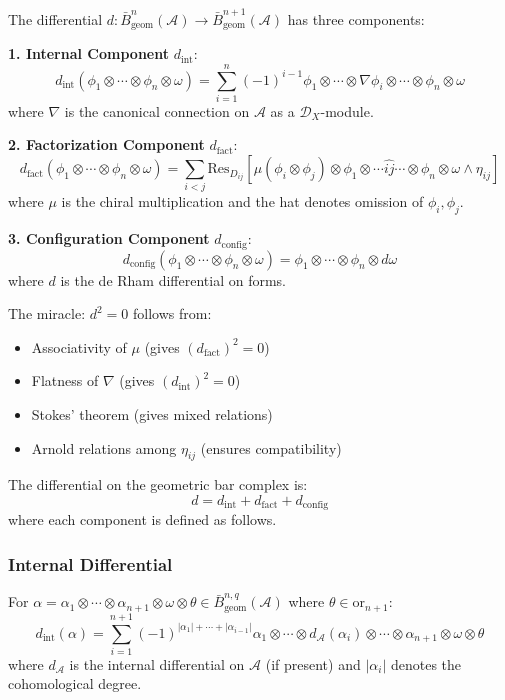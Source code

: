 \begin{definition}\label{def:bar-diff-detailed}
The differential $d: \bar{B}_{\text{geom}}^n(\mathcal{A}) \to \bar{B}_{\text{geom}}^{n+1}(\mathcal{A})$ has three components:

\textbf{1. Internal Component} $d_{\text{int}}$:
$$d_{\text{int}}(\phi_1 \otimes \cdots \otimes \phi_n \otimes \omega) = 
\sum_{i=1}^n (-1)^{i-1} \phi_1 \otimes \cdots \otimes \nabla\phi_i \otimes \cdots \otimes \phi_n \otimes \omega$$
where $\nabla$ is the canonical connection on $\mathcal{A}$ as a $\mathcal{D}_X$-module.

\textbf{2. Factorization Component} $d_{\text{fact}}$:
$$d_{\text{fact}}(\phi_1 \otimes \cdots \otimes \phi_n \otimes \omega) = 
\sum_{i<j} \text{Res}_{D_{ij}}[\mu(\phi_i \otimes \phi_j) \otimes \phi_1 \otimes \cdots \widehat{ij} \cdots \otimes \phi_n \otimes \omega \wedge \eta_{ij}]$$
where $\mu$ is the chiral multiplication and the hat denotes omission of $\phi_i, \phi_j$.

\textbf{3. Configuration Component} $d_{\text{config}}$:
$$d_{\text{config}}(\phi_1 \otimes \cdots \otimes \phi_n \otimes \omega) = 
\phi_1 \otimes \cdots \otimes \phi_n \otimes d\omega$$
where $d$ is the de Rham differential on forms.

The miracle: $d^2 = 0$ follows from:
\begin{itemize}
\item Associativity of $\mu$ (gives $(d_{\text{fact}})^2 = 0$)
\item Flatness of $\nabla$ (gives $(d_{\text{int}})^2 = 0$)  
\item Stokes' theorem (gives mixed relations)
\item Arnold relations among $\eta_{ij}$ (ensures compatibility)
\end{itemize}
\end{definition}

\begin{definition}\label{def:diff-total}
The differential on the geometric bar complex is:
\[
d = d_{\text{int}} + d_{\text{fact}} + d_{\text{config}}
\]
where each component is defined as follows.
\end{definition}
 
\subsubsection{Internal Differential}
 
\begin{definition}
For $\alpha = \alpha_1 \otimes \cdots \otimes \alpha_{n+1} \otimes \omega \otimes \theta \in 
\bar{B}^{n,q}_{\text{geom}}(\mathcal{A})$ where $\theta \in \text{or}_{n+1}$:
\[
d_{\text{int}}(\alpha) = \sum_{i=1}^{n+1} (-1)^{|\alpha_1| + \cdots + |\alpha_{i-1}|} 
\alpha_1 \otimes \cdots \otimes d_{\mathcal{A}}(\alpha_i) \otimes \cdots \otimes \alpha_{n+1} \otimes \omega \otimes \theta
\]
where $d_{\mathcal{A}}$ is the internal differential on $\mathcal{A}$ (if present) and $|\alpha_i|$ denotes 
the cohomological degree.
\end{definition}
 

